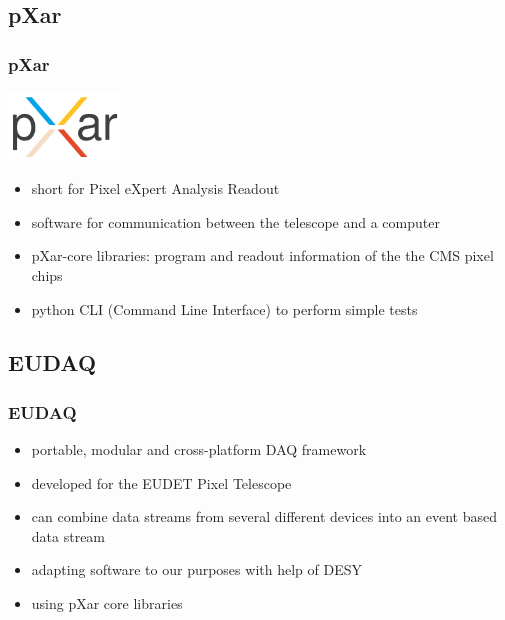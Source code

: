 \documentclass[9pt]{beamer}
\begin{document}
\subsection{pXar}
\begin{frame}
	\frametitle{pXar}
	\begin{center}
		\includegraphics[width=3cm]{Pics/pxar_logo}
	\end{center}
	\begin{itemize}
		\item short for Pixel eXpert Analysis Readout
		\item software for communication between the telescope and a computer
		\item pXar-core libraries: program and readout information of the the CMS pixel chips
		\item python CLI (Command Line Interface) to perform simple tests
	\end{itemize}
\end{frame}
\subsection{EUDAQ}
\begin{frame}
	\frametitle{EUDAQ}
			\begin{itemize}
				\item portable, modular and cross-platform DAQ framework
				\item developed for the EUDET Pixel Telescope
				\item can combine data streams from several different devices into an event based data stream
				\item adapting software to our purposes with help of DESY 
				\item using pXar core libraries
			\end{itemize}
\end{frame}
\end{document}

